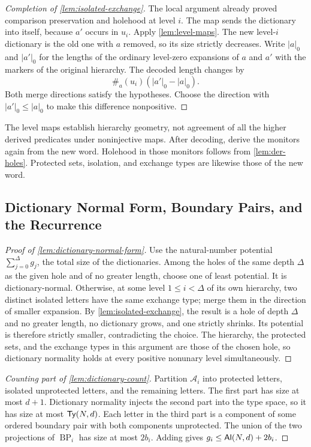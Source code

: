 \begin{proof}[Completion of \cref{lem:isolated-exchange}]
The local argument already proved comparison preservation and holehood
at level $i$. The map sends the dictionary into itself, because $a'$ occurs
in $u_i$. Apply \cref{lem:level-maps}. The new level-$i$ dictionary is the old
one with $a$ removed, so its size strictly decreases. Write $|a|_0$ and
$|a'|_0$ for the lengths of the ordinary level-zero expansions of $a$ and
$a'$ with the markers of the original hierarchy. The decoded length changes by
\[
 \#_a(u_i)(|a'|_0-|a|_0).
\]
Both merge directions satisfy the hypotheses. Choose the direction with
$|a'|_0\le|a|_0$ to make this difference nonpositive.
\end{proof}

The level maps establish hierarchy geometry, not agreement of all the
higher derived predicates under noninjective maps. After decoding, derive
the monitors again from the new word. Holehood in those monitors follows
from \cref{lem:der-holes}. Protected sets, isolation, and exchange types
are likewise those of the new word.

\subsection{Dictionary Normal Form, Boundary Pairs, and the Recurrence}

\begin{proof}[Proof of \cref{lem:dictionary-normal-form}]
Use the natural-number potential $\sum_{j=0}^{\Delta}g_j$, the total
size of the dictionaries. Among the holes of the same depth $\Delta$ as the
given hole and of no greater length, choose one of least potential. It is
dictionary-normal. Otherwise, at some level $1\le i<\Delta$ of its own
hierarchy, two distinct isolated letters have the same exchange type; merge
them in the direction of smaller expansion. By \cref{lem:isolated-exchange},
the result is a hole of depth $\Delta$ and no greater length, no dictionary
grows, and one strictly shrinks. Its potential is therefore strictly
smaller, contradicting the choice. The hierarchy, the protected sets, and
the exchange types in this argument are those of the chosen hole, so
dictionary normality holds at every positive nonunary level simultaneously.
\end{proof}

\begin{proof}[Counting part of \cref{lem:dictionary-count}]
Partition $\mathcal A_i$ into protected letters, isolated unprotected
letters, and the remaining letters. The first part has size at most
$d+1$. Dictionary normality injects the second part into the type space, so it has
size at most $\mathsf{Ty}(N,d)$. Each letter in the third part is a component of
some ordered boundary pair with both components unprotected. The union
of the two projections of $\operatorname{BP}_i$ has size at most $2b_i$.
Adding gives $g_i\le \mathsf{Al}(N,d)+2b_i$.
\end{proof}

